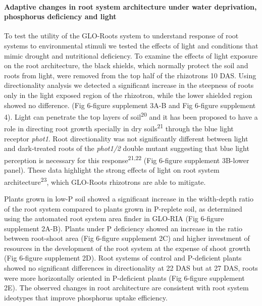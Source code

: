 \documentclass[]{article}
\begin{document}
\paragraph{Adaptive changes in root system architecture under water
deprivation, phosphorus deficiency and
light}\label{adaptive-changes-in-root-system-architecture-under-water-deprivation-phosphorus-deficiency-and-light}

To test the utility of the GLO-Roots system to understand response of
root systems to environmental stimuli we tested the effects of light and
conditions that mimic drought and nutritional deficiency. To examine the
effects of light exposure on the root architecture, the black shields,
which normally protect the soil and roots from light, were removed from
the top half of the rhizotrons 10 DAS. Using directionality analysis we
detected a significant increase in the steepness of roots only in the
light exposed region of the rhizotron, while the lower shielded region
showed no difference. (Fig 6-figure supplement 3A-B and Fig 6-figure
supplement 4). Light can penetrate the top layers of
soil\textsuperscript{20} and it has been proposed to have a role in
directing root growth specially in dry soils\textsuperscript{21} through
the blue light receptor \emph{phot1}. Root directionality was not
significantly different between light and dark-treated roots of the
\emph{phot1/2} double mutant suggesting that blue light perception is
necessary for this response\textsuperscript{21,22} (Fig 6-figure
supplement 3B-lower panel). These data highlight the strong effects of
light on root system architecture\textsuperscript{23}, which GLO-Roots
rhizotrons are able to mitigate.

Plants grown in low-P soil showed a significant increase in the
width-depth ratio of the root system compared to plants grown in
P-replete soil, as determined using the automated root system area
finder in GLO-RIA (Fig 6-figure supplement 2A-B). Plants under P
deficiency showed an increase in the ratio between root-shoot area (Fig
6-figure supplement 2C) and higher investment of resources in the
development of the root system at the expense of shoot growth (Fig
6-figure supplement 2D). Root systems of control and P-deficient plants
showed no significant differences in directionality at 22 DAS but at 27
DAS, roots were more horizontally oriented in P-deficient plants (Fig
6-figure supplement 2E). The observed changes in root architecture are
consistent with root system ideotypes that improve phosphorus uptake
efficiency.
\end{document}
